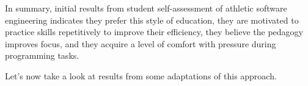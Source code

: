 In summary, initial results from student self-assessment of athletic software engineering indicates they prefer this style of education, they are motivated to practice skills repetitively to improve their efficiency, they believe the pedagogy improves focus, and they acquire a level of comfort with pressure during programming tasks. 

Let's now take a look at results from some adaptations of this approach. 





